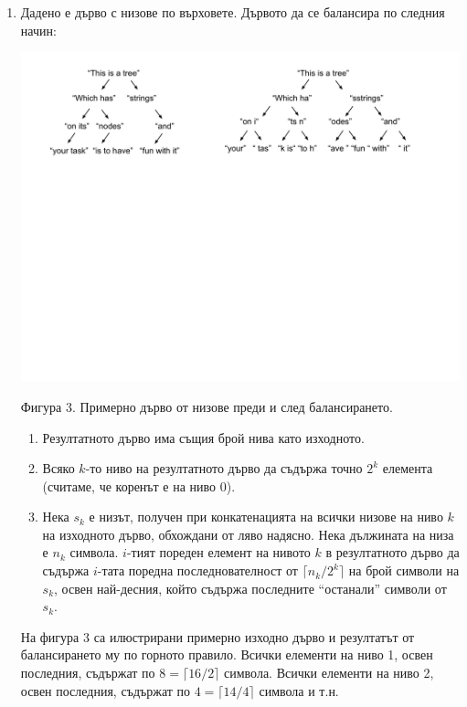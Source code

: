 \documentclass[12pt,a4paper]{article}
\begin{document}
\begin{enumerate}
	\item Дадено е дърво с низове по върховете. Дървото да се балансира по следния начин:

	\begin{flushleft}
	\includegraphics[width=15cm]{images/tree4}

	\vspace{-200px}

	Фигура 3. Примерно дърво от низове преди и след балансирането.
	\end{flushleft}


	\begin{enumerate}
	  \item Резултатното дърво има същия брой нива като изходното.
		\item Всяко $k$-то ниво на резултатното дърво да съдържа точно $2^k$ елемента (считаме, че коренът е на ниво 0).
		\item Нека $s_k$ е низът, получен при конкатенацията на всички низове на ниво $k$ на изходното дърво, обхождани от ляво надясно. Нека дължината на низа е $n_k$ символа. $i$-тият пореден елемент на нивото $k$ в резултатното дърво да съдържа $i$-тата поредна последнователност от $\lceil{n_k/{2^k}}\rceil$ на брой символи на $s_k$, освен най-десния, който съдържа последните ``останали'' символи от $s_k$.
	\end{enumerate}

	На фигура 3 са илюстрирани примерно изходно дърво и резултатът от балансирането му по горното правило. Всички елементи на ниво 1, освен последния, съдържат по $8=\lceil{16/2}\rceil$ символа. Всички елементи на ниво 2, освен последния, съдържат по $4=\lceil{14/4}\rceil$ символа и т.н.

\end{enumerate}
\end{document}
